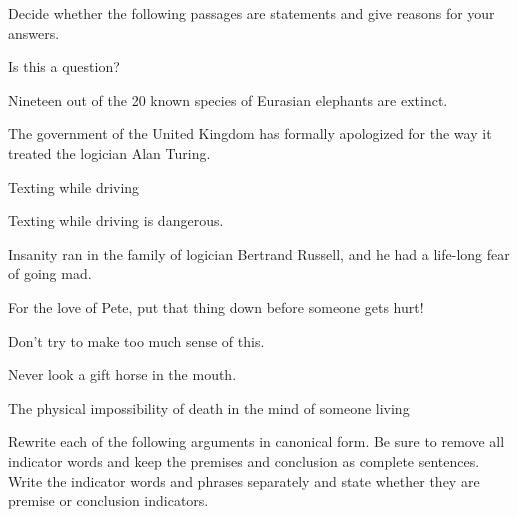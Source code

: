 \noindent\problempart Decide whether the following passages are statements and give reasons for your answers.
\begin{exercises}
\item Is this a question? 
\item Nineteen out of the 20 known species of Eurasian elephants are extinct. 
\item The government of the United Kingdom has formally apologized for the way it treated the logician Alan Turing.  

\item Texting while driving 
\item Texting while driving is dangerous. 
\item Insanity ran in the family of logician Bertrand Russell, and he had a life-long fear of going mad. 
\item For the love of Pete, put that thing down before someone gets hurt!  
\item Don't try to make too much sense of this. 
\item Never look a gift horse in the mouth.  
\item The physical impossibility of death in the mind of someone living  
\end{exercises}

\noindent\problempart Rewrite each of the following arguments in canonical form. Be sure to remove all indicator words and keep the premises and conclusion as complete sentences. Write the indicator words and phrases separately and state whether they are premise or conclusion indicators. 


